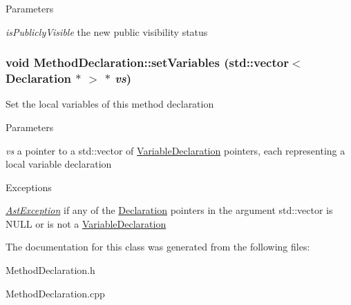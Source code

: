 \begin{DoxyParams}{Parameters}
\item[{\em isPubliclyVisible}]the new public visibility status \end{DoxyParams}
\hypertarget{classMethodDeclaration_ad65f55276d3ea08cc0156a8a4eb3e035}{
\subsubsection[{setVariables}]{\setlength{\rightskip}{0pt plus 5cm}void MethodDeclaration::setVariables (std::vector$<$ {\bf Declaration} $\ast$ $>$ $\ast$ {\em vs})}}
\label{classMethodDeclaration_ad65f55276d3ea08cc0156a8a4eb3e035}
Set the local variables of this method declaration


\begin{DoxyParams}{Parameters}
\item[{\em vs}]a pointer to a std::vector of \hyperlink{classVariableDeclaration}{VariableDeclaration} pointers, each representing a local variable declaration \end{DoxyParams}

\begin{DoxyExceptions}{Exceptions}
\item[{\em \hyperlink{classAstException}{AstException}}]if any of the \hyperlink{classDeclaration}{Declaration} pointers in the argument std::vector is NULL or is not a \hyperlink{classVariableDeclaration}{VariableDeclaration} \end{DoxyExceptions}


The documentation for this class was generated from the following files:\begin{DoxyCompactItemize}
\item 
MethodDeclaration.h\item 
MethodDeclaration.cpp\end{DoxyCompactItemize}
